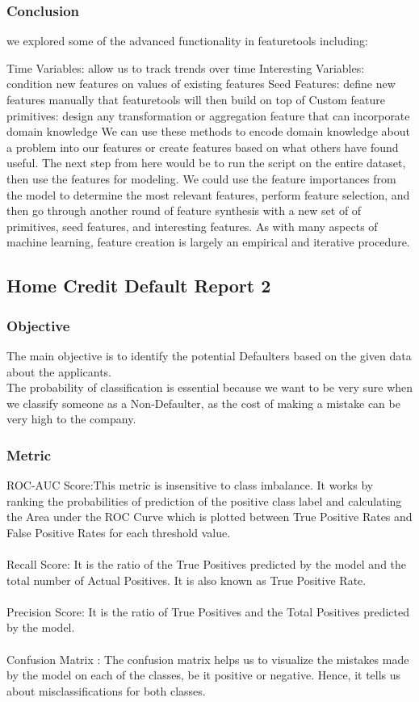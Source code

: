 \documentclass[twoside,a4paper]{article}
\begin{document}
\subsubsection{Conclusion}
 we explored some of the advanced functionality in featuretools including:

Time Variables: allow us to track trends over time
Interesting Variables: condition new features on values of existing features
Seed Features: define new features manually that featuretools will then build on top of
Custom feature primitives: design any transformation or aggregation feature that can incorporate domain knowledge
We can use these methods to encode domain knowledge about a problem into our features or create features based on what others have found useful. The next step from here would be to run the script on the entire dataset, then use the features for modeling. We could use the feature importances from the model to determine the most relevant features, perform feature selection, and then go through another round of feature synthesis with a new set of of primitives, seed features, and interesting features. As with many aspects of machine learning, feature creation is largely an empirical and iterative procedure.

\subsection{Home Credit Default Report 2}

\subsubsection{Objective}
The main objective is to identify the potential Defaulters based on the given data about the applicants.\\
The probability of classification is essential because we want to be very sure when we classify someone as a Non-Defaulter, as the cost of making a mistake can be very high to the company.
\subsubsection{Metric}
 ROC-AUC Score:This metric is insensitive to class imbalance. It works by ranking the probabilities of prediction of the positive class label and calculating the Area under the ROC Curve which is plotted between True Positive Rates and False Positive Rates for each threshold value.\\\\
 Recall Score: It is the ratio of the True Positives predicted by the model and the total number of Actual Positives. It is also known as True Positive Rate.\\\\
 Precision Score: It is the ratio of True Positives and the Total Positives predicted by the model.
\\\\
 Confusion Matrix : The confusion matrix helps us to visualize the mistakes made by the model on each of the classes, be it positive or negative. Hence, it tells us about misclassifications for both classes.
\\
\end{document}
